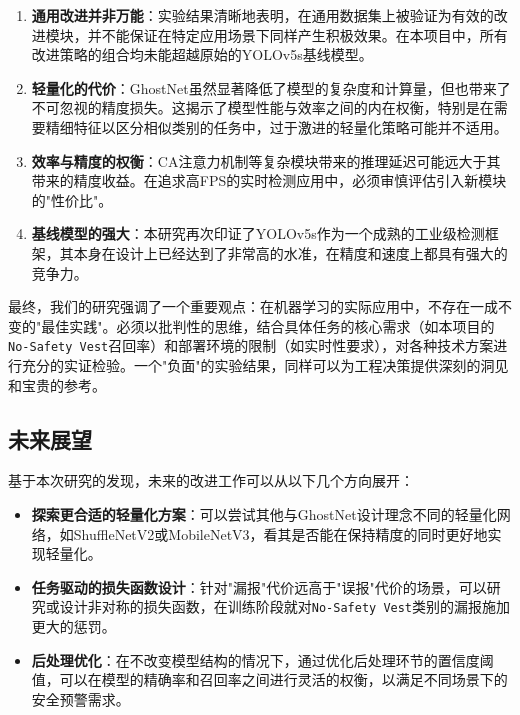 \documentclass[a4paper]{ctexart}
\begin{document}
\begin{enumerate}
    \item \textbf{通用改进并非万能}：实验结果清晰地表明，在通用数据集上被验证为有效的改进模块，并不能保证在特定应用场景下同样产生积极效果。在本项目中，所有改进策略的组合均未能超越原始的YOLOv5s基线模型。
    \item \textbf{轻量化的代价}：GhostNet虽然显著降低了模型的复杂度和计算量，但也带来了不可忽视的精度损失。这揭示了模型性能与效率之间的内在权衡，特别是在需要精细特征以区分相似类别的任务中，过于激进的轻量化策略可能并不适用。
    \item \textbf{效率与精度的权衡}：CA注意力机制等复杂模块带来的推理延迟可能远大于其带来的精度收益。在追求高FPS的实时检测应用中，必须审慎评估引入新模块的"性价比"。
    \item \textbf{基线模型的强大}：本研究再次印证了YOLOv5s作为一个成熟的工业级检测框架，其本身在设计上已经达到了非常高的水准，在精度和速度上都具有强大的竞争力。
\end{enumerate}

最终，我们的研究强调了一个重要观点：在机器学习的实际应用中，不存在一成不变的"最佳实践"。必须以批判性的思维，结合具体任务的核心需求（如本项目的\texttt{No-Safety Vest}召回率）和部署环境的限制（如实时性要求），对各种技术方案进行充分的实证检验。一个"负面"的实验结果，同样可以为工程决策提供深刻的洞见和宝贵的参考。

\subsection{未来展望}
基于本次研究的发现，未来的改进工作可以从以下几个方向展开：
\begin{itemize}
    \item \textbf{探索更合适的轻量化方案}：可以尝试其他与GhostNet设计理念不同的轻量化网络，如ShuffleNetV2或MobileNetV3，看其是否能在保持精度的同时更好地实现轻量化。
    \item \textbf{任务驱动的损失函数设计}：针对"漏报"代价远高于"误报"代价的场景，可以研究或设计非对称的损失函数，在训练阶段就对\texttt{No-Safety Vest}类别的漏报施加更大的惩罚。
    \item \textbf{后处理优化}：在不改变模型结构的情况下，通过优化后处理环节的置信度阈值，可以在模型的精确率和召回率之间进行灵活的权衡，以满足不同场景下的安全预警需求。
\end{itemize}
\end{document}
